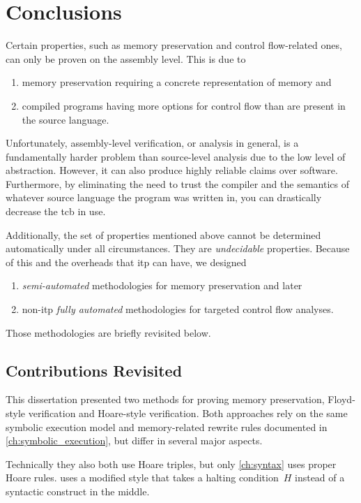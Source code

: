 \chapter{Conclusions}\label{ch:conclusions}
Certain properties, such as memory preservation and control flow-related ones, can only be proven on the assembly level.
This is due to
\begin{enumerate}
  \item memory preservation requiring a concrete representation of memory and
  \item compiled programs having more options for control flow than are present in the source language.
\end{enumerate}
Unfortunately, assembly-level verification, or analysis in general, is a fundamentally harder problem than source-level analysis due to the low level of abstraction.
However, it can also produce highly reliable claims over software.
Furthermore, by eliminating the need to trust the compiler and the semantics of whatever source language the program was written in, you can drastically decrease the \ac{tcb} in use.

Additionally, the set of properties mentioned above cannot be determined automatically under all circumstances. They are \emph{undecidable} properties.
Because of this and the overheads that \ac{itp} can have, we designed
\begin{enumerate}
  \item \emph{semi-automated} methodologies for memory preservation and later
  \item non-\ac{itp} \emph{fully automated} methodologies for targeted control flow analyses.
\end{enumerate}
Those methodologies are briefly revisited below.

\section{Contributions Revisited}
This dissertation presented two methods for proving memory preservation,
Floyd-style verification and Hoare-style verification.
Both approaches rely on the same symbolic execution model and memory-related rewrite rules documented in \cref{ch:symbolic_execution}, but differ in several major aspects.
\begin{remark}
  Technically they also both use Hoare triples, but only \cref{ch:syntax} uses proper Hoare rules.
   uses a modified style that takes a halting condition~$H$ instead of a syntactic construct in the middle.
\end{remark}

